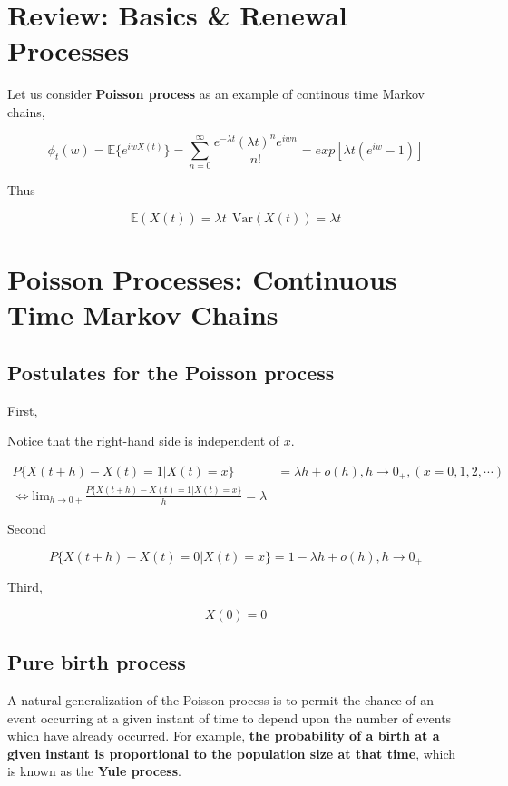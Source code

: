 \documentclass[12pt]{article}
\theoremstyle{nonumberbreak}
\begin{document}
\section{Review: Basics \& Renewal Processes}



Let us consider \textbf{Poisson process} as an example of continous time Markov chains,

$$
\phi_t (w) = \mathbb{E} \{ e^{iwX(t)} \} = \sum_{n=0}^\infty \frac{e^{-\lambda t} (\lambda t)^n e^{iwn}}{n!} = exp[\lambda t (e^{iw} -1)]
$$

Thus 

$$
\mathbb{E} (X(t)) = \lambda t \ \ \mathrm{Var}(X(t)) = \lambda t
$$


\section{Poisson Processes: Continuous Time Markov Chains}


\subsection{Postulates for the Poisson process}


First, 

Notice that the right-hand side is independent of $x$. 

$$
\begin{aligned}
P\{ X(t+h) - X(t) = 1 | X(t) = x \} &= \lambda h + o(h), h \to 0_+, (x=0,1,2,\cdots) \\[10pt]
\Leftrightarrow \mathrm{lim}_{h \to 0+} \frac{P\{ X(t+h) - X(t) = 1 | X(t) = x \}}{h} = \lambda
\end{aligned}
$$



Second


$$
P\{ X(t+h) - X(t) = 0 | X(t) = x \} = 1 - \lambda h + o(h), h \to 0_+
$$


Third,

$$
X(0) = 0 
$$


\subsection{Pure birth process}

A natural generalization of the Poisson process is to permit the chance of
an event occurring at a given instant of time to depend upon the number of events which have already occurred. For example, \textbf{the probability of a birth at a given instant is proportional to the population size at that time}, which is known as the \textbf{Yule process}.
\end{document}
